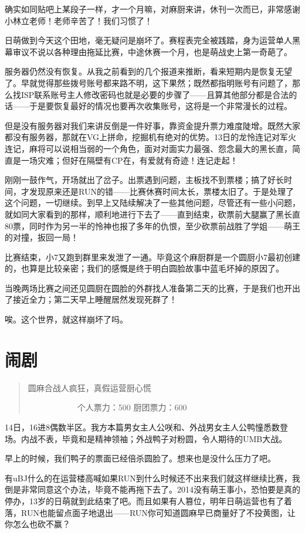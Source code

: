 确实如同贴吧上某段子一样，才一个月嘛，对麻厨来讲，休刊一次而已，非常感谢小林立老师！老师辛苦了！我们习惯了！

日萌做到今天这个田地，毫无疑问是崩坏了。赛程表完全被践踏，身为运营单人黑幕审议不说以各种理由拖延比赛，中途休赛一个月，也是萌战史上第一奇葩了。

服务器仍然没有恢复。从我之前看到的几个报道来推断，看来短期内是恢复无望了。早就觉得那些拨号账号都来路不明，这下果然；既然都指明账号有问题了，那么找ISP联系账号主人修改密码也就是必要的步骤了——且算其他部分都是合法的话——于是要恢复最好的情况也要再次收集账号，这将是一个非常漫长的过程。

但是没有服务器对我们来讲反倒是一件好事，靠资金提升票力难度陡增。既然大家都没有服务器，那就在VG上拼命，挖掘机有绝对的优势。13日的龙怜连记对军火连记，麻将可以说相当弱的一个角色，面对对面实力最强、怨念最大的黑长直，简直是一场灾难；但好在隔壁有CP在，有爱就有奇迹！连记走起！

刚刚一鼓作气，开场就出了岔子。出票遇到问题，主板找不到票楼；搞了好长时间，才发现原来还是RUN的错——比赛休赛时间太长，票楼太旧了。于是处理了这个问题，一切继续。到早上又陆续解决了一些其他问题，尽管还有一些小问题，就如同大家看到的那样，顺利地进行下去了——直到结束，砍票前大腿赢了黑长直80票，同时作为另一半的怜神也报了多年的仇恨，至少砍票前战胜了学姐——萌王的对撞，扳回一局！

比赛结束，小7又跑到群里来发泄了一通。毕竟这个麻厨群是一个圆厨小7最初创建的，也算是比较亲密；我们的感慨是终于明白圆脸故事中蓝毛坏掉的原因了。

当晚两场比赛之间还见圆厨在圆脸的外群找人准备第二天的比赛，于是我们也开出了接近全力；第二天早上睡醒居然发现死群了！

唉。这个世界，就这样崩坏了吗。


\section{闹剧}
\begin{quote}
圆麻合战人疯狂，真假运营厨心慌

　　　　　　个人票力：500 厨团票力：600
\end{quote}

14日，16进8偶数半区。我方本篇男女主人公咲和、外战男女主人公鸭憧悉数登场。内战不表，毕竟和是精神领袖；外战鸭子对粉圆，令人期待的UMB大战。

早上的时候，我们鸭子的票面已经倍杀圆脸了。想来也是没什么压力了吧。

有uBJ什么的在运营楼高喊如果RUN到什么时候还不出来我们就这样继续比赛，我倒是非常同意这个办法，毕竟不能再拖下去了。2014没有萌王事小，恐怕要是真的停办，13岁的日萌就到此结束了吧。而且如果有人篡位，明年日萌运营也有了着落，RUN也能留点面子地退出——RUN你可知道圆麻早已商量好了不投黄图，让你怎么也砍不赢？


